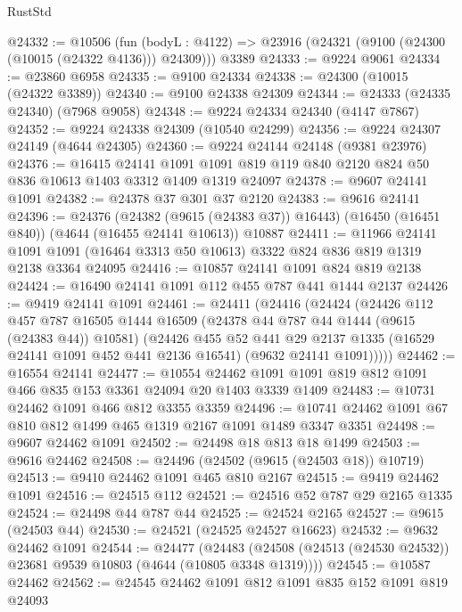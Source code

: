 \begin{lexlean}{RustStd}
\begin{coremodule}
@24332 := @10506
    (fun (bodyL : @4122) => @23916 (@24321 (@9100 (@24300 (@10015 (@24322 @4136))) @24309)))
    @3389
@24333 := @9224 @9061
@24334 := @23860 @6958
@24335 := @9100 @24334
@24338 := @24300 (@10015 (@24322 @3389))
@24340 := @9100 @24338 @24309
@24344 := @24333 (@24335 @24340) (@7968 @9058)
@24348 := @9224 @24334 @24340 (@4147 @7867)
@24352 := @9224 @24338 @24309 (@10540 @24299)
@24356 := @9224 @24307 @24149 (@4644 @24305)
@24360 := @9224 @24144 @24148 (@9381 @23976)
@24376 := @16415
    @24141
    @1091
    @1091
    @819
    @119
    @840
    @2120
    @824
    @50
    @836
    @10613
    @1403
    @3312
    @1409
    @1319
    @24097
@24378 := @9607 @24141 @1091
@24382 := @24378 @37 @301 @37 @2120
@24383 := @9616 @24141
@24396 := @24376
    (@24382 (@9615 (@24383 @37)) @16443)
    (@16450 (@16451 @840))
    (@4644 (@16455 @24141 @10613))
    @10887
@24411 := @11966
    @24141
    @1091
    @1091
    (@16464 @3313 @50 @10613)
    @3322
    @824
    @836
    @819
    @1319
    @2138
    @3364
    @24095
@24416 := @10857 @24141 @1091 @824 @819 @2138
@24424 := @16490 @24141 @1091 @112 @455 @787 @441 @1444 @2137
@24426 := @9419 @24141 @1091
@24461 := @24411
    (@24416
      (@24424
        (@24426
          @112
          @457
          @787
          @16505
          @1444
          @16509
          (@24378 @44 @787 @44 @1444 (@9615 (@24383 @44)) @10581)
          (@24426
            @455
            @52
            @441
            @29
            @2137
            @1335
            (@16529 @24141 @1091 @452 @441 @2136 @16541)
            (@9632 @24141 @1091)))))
@24462 := @16554 @24141
@24477 := @10554
    @24462
    @1091
    @1091
    @819
    @812
    @1091
    @466
    @835
    @153
    @3361
    @24094
    @20
    @1403
    @3339
    @1409
@24483 := @10731 @24462 @1091 @466 @812 @3355 @3359
@24496 := @10741 @24462 @1091 @67 @810 @812 @1499 @465 @1319 @2167 @1091 @1489 @3347 @3351
@24498 := @9607 @24462 @1091
@24502 := @24498 @18 @813 @18 @1499
@24503 := @9616 @24462
@24508 := @24496 (@24502 (@9615 (@24503 @18)) @10719)
@24513 := @9410 @24462 @1091 @465 @810 @2167
@24515 := @9419 @24462 @1091
@24516 := @24515 @112
@24521 := @24516 @52 @787 @29 @2165 @1335
@24524 := @24498 @44 @787 @44
@24525 := @24524 @2165
@24527 := @9615 (@24503 @44)
@24530 := @24521 (@24525 @24527 @16623)
@24532 := @9632 @24462 @1091
@24544 := @24477
    (@24483 (@24508 (@24513 (@24530 @24532)) @23681 @9539 @10803 (@4644 (@10805 @3348 @1319))))
@24545 := @10587 @24462
@24562 := @24545
    @24462
    @1091
    @812
    @1091
    @835
    @152
    @1091
    @819
    @24093

\end{coremodule}
\end{lexlean}
